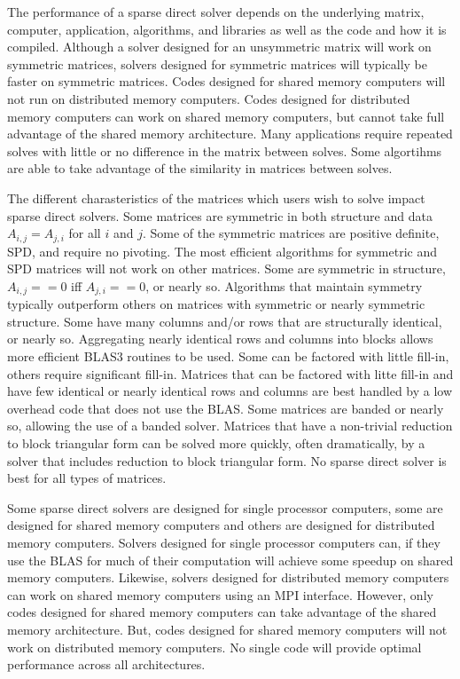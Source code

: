 \documentclass[acmtocl]{acmtrans2m}
\begin{document}
The performance of a sparse direct solver depends on the underlying
matrix, computer, application, algorithms, and libraries as well as
the code and how it is compiled.  Although a solver designed for an
unsymmetric matrix will work on symmetric matrices, solvers designed
for symmetric matrices will typically be faster on symmetric matrices.
Codes designed for shared memory computers will not run on distributed
memory computers.  Codes designed for distributed memory computers can
work on shared memory computers, but cannot take full advantage of the
shared memory architecture.  Many applications require repeated solves
with little or no difference in the matrix between solves.  Some
algortihms are able to take advantage of the similarity in matrices
between solves.

The different charasteristics of the matrices which users wish to
solve impact sparse direct solvers.  Some matrices are symmetric in both
structure and data $A_{i,j} = A_{j,i}$ for all $i$ and $j$.  Some of
the symmetric matrices are positive definite, SPD, and require no
pivoting.  The most efficient algorithms for symmetric and SPD
matrices will not work on other matrices.  Some are symmetric in
structure, $A_{i,j} == 0$ iff $A_{j,i} == 0$, or nearly so.
Algorithms that maintain symmetry typically outperform others on
matrices with symmetric or nearly symmetric structure.  Some have many
columns and/or rows that are structurally identical, or nearly so.
Aggregating nearly identical rows and columns into blocks allows more
efficient BLAS3 routines to be used.  Some can be factored with little
fill-in, others require significant fill-in.  Matrices that can be
factored with litte fill-in and have few identical or nearly identical
rows and columns are best handled by a low overhead code that does not
use the BLAS.  Some matrices are banded or nearly so, allowing the use
of a banded solver.  Matrices that have a non-trivial reduction to
block triangular form can be solved more quickly, often dramatically,
by a solver that includes reduction to block triangular form.  No sparse direct solver is best for all types of matrices.  

Some sparse direct solvers are designed for single processor
computers, some are designed for shared memory computers and others
are designed for distributed memory computers.  Solvers designed for
single processor computers can, if they use the BLAS for much of their
computation will achieve some speedup on shared memory computers.
Likewise, solvers designed for distributed memory computers can work
on shared memory computers using an MPI interface.  However, only
codes designed for shared memory computers can take advantage of the
shared memory architecture.  But, codes designed for shared memory
computers will not work on distributed memory computers.  No single
code will provide optimal performance across all architectures.
\end{document}
